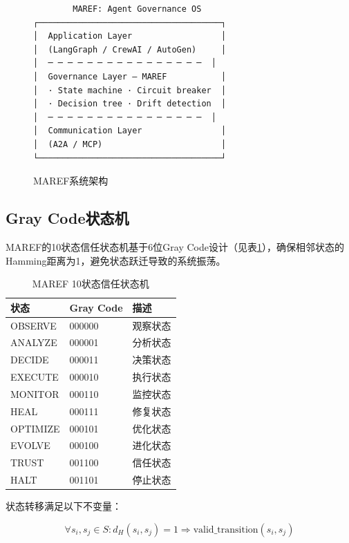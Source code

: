 \begin{figure}[htbp]
\centering
\begin{verbatim}
        MAREF: Agent Governance OS
┌─────────────────────────────────────┐
│  Application Layer                  │
│  (LangGraph / CrewAI / AutoGen)     │
│  ─ ─ ─ ─ ─ ─ ─ ─ ─ ─ ─ ─ ─ ─ ─ ─  │
│  Governance Layer — MAREF           │
│  · State machine · Circuit breaker  │
│  · Decision tree · Drift detection  │
│  ─ ─ ─ ─ ─ ─ ─ ─ ─ ─ ─ ─ ─ ─ ─ ─  │
│  Communication Layer                │
│  (A2A / MCP)                        │
└─────────────────────────────────────┘
\end{verbatim}
\caption{MAREF系统架构}
\label{fig:architecture}
\end{figure}

\subsection{Gray Code状态机}

MAREF的10状态信任状态机基于6位Gray Code设计（见表\ref{tab:states}），确保相邻状态的Hamming距离为1，避免状态跃迁导致的系统振荡。

\begin{table}[htbp]
\caption{MAREF 10状态信任状态机}
\label{tab:states}
\begin{tabular}{lll}
\toprule
\textbf{状态} & \textbf{Gray Code} & \textbf{描述} \\
\midrule
OBSERVE & 000000 & 观察状态 \\
ANALYZE & 000001 & 分析状态 \\
DECIDE & 000011 & 决策状态 \\
EXECUTE & 000010 & 执行状态 \\
MONITOR & 000110 & 监控状态 \\
HEAL & 000111 & 修复状态 \\
OPTIMIZE & 000101 & 优化状态 \\
EVOLVE & 000100 & 进化状态 \\
TRUST & 001100 & 信任状态 \\
HALT & 001101 & 停止状态 \\
\bottomrule
\end{tabular}
\end{table}

状态转移满足以下不变量：

\begin{equation}
\forall s_i, s_j \in S: d_H(s_i, s_j) = 1 \Rightarrow \text{valid\_transition}(s_i, s_j)
\end{equation}

